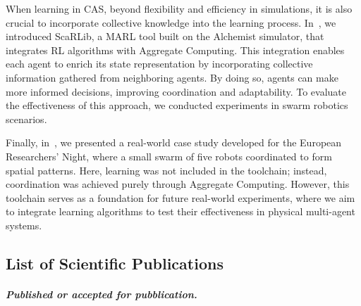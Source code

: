 \documentclass[12pt]{article}
\begin{document}
When learning in CAS, beyond flexibility and efficiency in simulations, it is also crucial to incorporate 
 collective knowledge into the learning process. 
% 
In~\cite{DBLP:conf/coordination/DominiCAV23,DBLP:journals/scp/DominiCAV24}, we introduced ScaRLib, a MARL tool built on the Alchemist simulator, 
 that integrates RL algorithms with Aggregate Computing.
%
This integration enables each agent to enrich its state representation by incorporating collective information gathered from neighboring agents. 
%
By doing so, agents can make more informed decisions, improving coordination and adaptability.
% 
To evaluate the effectiveness of this approach, we conducted experiments in swarm robotics scenarios.

Finally, in~\cite{DBLP:conf/coordination/AguzziNDR25}, we presented a real-world case study developed for the 
 European Researchers' Night, where a small swarm of five robots coordinated to form spatial patterns.
%
Here, learning was not included in the toolchain; instead, coordination was achieved purely through Aggregate Computing. 
%
However, this toolchain serves as a foundation for future real-world experiments, where we aim to integrate learning algorithms 
 to test their effectiveness in physical multi-agent systems.

\subsection{List of Scientific Publications}\label{sec:pubblications}

 \sloppypar
 \paragraph{\emph{Published or accepted for pubblication.}}
 
\end{document}
